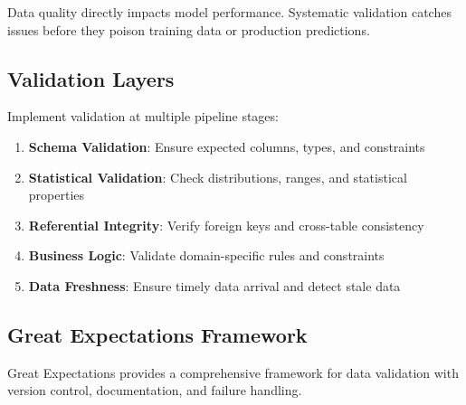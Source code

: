 Data quality directly impacts model performance. Systematic validation catches issues before they poison training data or production predictions.

\subsection{Validation Layers}

Implement validation at multiple pipeline stages:

\begin{enumerate}
    \item \textbf{Schema Validation}: Ensure expected columns, types, and constraints
    \item \textbf{Statistical Validation}: Check distributions, ranges, and statistical properties
    \item \textbf{Referential Integrity}: Verify foreign keys and cross-table consistency
    \item \textbf{Business Logic}: Validate domain-specific rules and constraints
    \item \textbf{Data Freshness}: Ensure timely data arrival and detect stale data
\end{enumerate}

\subsection{Great Expectations Framework}

Great Expectations provides a comprehensive framework for data validation with version control, documentation, and failure handling.

